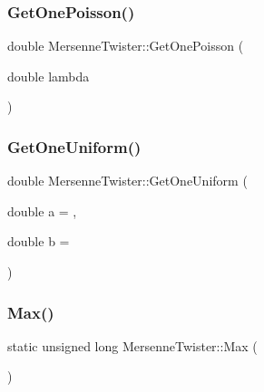 \hypertarget{classMersenneTwister_a2681743b9e75ef9d3d323c22b006853e}{}\label{classMersenneTwister_a2681743b9e75ef9d3d323c22b006853e} 
\subsubsection{\texorpdfstring{Get\+One\+Poisson()}{GetOnePoisson()}}
{\footnotesize\ttfamily double Mersenne\+Twister\+::\+Get\+One\+Poisson (\begin{DoxyParamCaption}\item[{double}]{lambda }\end{DoxyParamCaption})}

\hypertarget{classMersenneTwister_a59d15261d26fe5558c1a1556b3f61b98}{}\label{classMersenneTwister_a59d15261d26fe5558c1a1556b3f61b98} 
\subsubsection{\texorpdfstring{Get\+One\+Uniform()}{GetOneUniform()}}
{\footnotesize\ttfamily double Mersenne\+Twister\+::\+Get\+One\+Uniform (\begin{DoxyParamCaption}\item[{double}]{a = {},  }\item[{double}]{b = {} }\end{DoxyParamCaption})}

\hypertarget{classMersenneTwister_a61ef4663e8709411b422b4b1a7b40328}{}\label{classMersenneTwister_a61ef4663e8709411b422b4b1a7b40328} 
\subsubsection{\texorpdfstring{Max()}{Max()}}
{\footnotesize\ttfamily static unsigned long Mersenne\+Twister\+::\+Max (\begin{DoxyParamCaption}{ }\end{DoxyParamCaption})\hspace{0.3cm}{\ttfamily [static]}}

\hypertarget{classMersenneTwister_a80cca98c48305912aa8cc1b6e6ce5969}{}\label{classMersenneTwister_a80cca98c48305912aa8cc1b6e6ce5969} 
